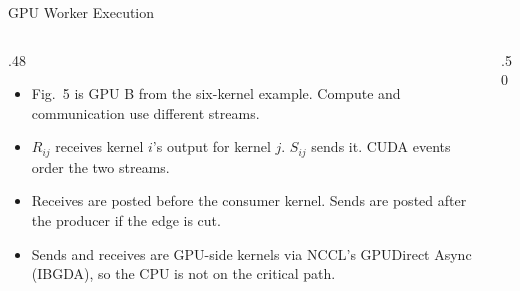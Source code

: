 \begin{frame}[t,label=mm_ts_worker_01]{GPU Worker Execution}

  \par
  \vspace{.02cm}
  \begin{columns}[c,onlytextwidth]
    \begin{column}{.48\textwidth}
      {\footnotesize\begin{itemize}\setlength{\itemsep}{.09cm}
        \item Fig.~5 is GPU B from the six-kernel example. Compute and communication use different streams.
        \item \(R_{ij}\) receives kernel \(i\)'s output for kernel \(j\). \(S_{ij}\) sends it. CUDA events order the two streams.
        \item Receives are posted before the consumer kernel. Sends are posted after the producer if the edge is cut.
        \item Sends and receives are GPU-side kernels via NCCL's GPUDirect Async (IBGDA), so the CPU is not on the critical path.
      \end{itemize}}
      \vspace{.10cm}
    \end{column}
    \begin{column}{.50\textwidth}
    \end{column}
  \end{columns}
\end{frame}

